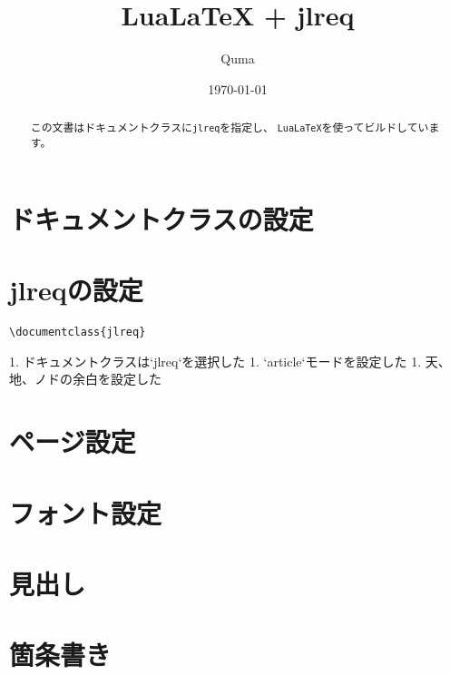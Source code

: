 \documentclass{jlreq}
\title{LuaLaTeX + jlreq}
\author{Quma}
\date{\today}
\begin{document}
\maketitle

\begin{abstract}
  この文書はドキュメントクラスに\texttt{jlreq}を指定し、
  \texttt{LuaLaTeX}を使ってビルドしています。
\end{abstract}

\tableofcontents

\section{ドキュメントクラスの設定}

\section{jlreqの設定}

\begin{verbatim}
\documentclass{jlreq}
\end{verbatim}

\begin{markdown}
  1. ドキュメントクラスは`jlreq`を選択した
  1. `article`モードを設定した
  1. 天、地、ノドの余白を設定した
\end{markdown}



\section{ページ設定}




\section{フォント設定}




\section{見出し}


\section{箇条書き}




\end{document}

